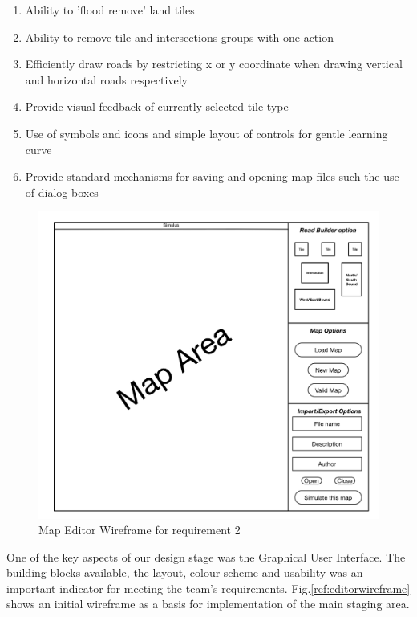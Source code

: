 \begin{enumerate}
\begin{enumerate}[label*=\arabic*.]
	\item Ability to 'flood remove' land tiles
	\item Ability to remove tile and intersections groups with one action
	\item Efficiently draw roads by restricting x or y coordinate when drawing vertical and horizontal roads respectively
	\item Provide visual feedback of currently selected tile type
	\item Use of symbols and icons and simple layout of controls for gentle learning curve
	\item Provide standard mechanisms for saving and opening map files such the use of dialog boxes
  \end{enumerate}
\end{enumerate}

\begin{figure}[h]
	\begin{center}
		\includegraphics{img/Map_Editor_Wireframe.png}
		\caption{Map Editor Wireframe for requirement 2}
		\label{fig:editorwireframe}
	\end{center}
\end{figure}

One of the key aspects of our design stage was the Graphical User Interface. The building blocks available, the layout, colour scheme and usability was an important indicator for meeting the team's requirements. Fig.\ref{ref:editorwireframe} shows an initial wireframe as a basis for implementation of the main staging area.

